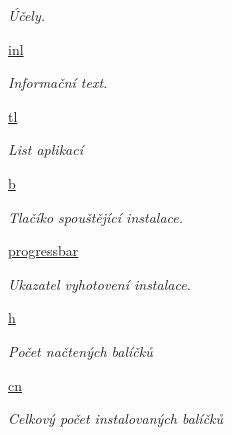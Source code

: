 \begin{DoxyCompactItemize}
\begin{DoxyCompactList}\small\item\em Účely. \end{DoxyCompactList}\item 
\hypertarget{classmnFocus_1_1App_afe256570e794996242e331f33796610a}{\hyperlink{classmnFocus_1_1App_afe256570e794996242e331f33796610a}{inl}}\label{db/d36/classmnFocus_1_1App_afe256570e794996242e331f33796610a}

\begin{DoxyCompactList}\small\item\em Informační text. \end{DoxyCompactList}\item 
\hypertarget{classmnFocus_1_1App_a8f12bcadf8d094ec3c00f5c003ec963c}{\hyperlink{classmnFocus_1_1App_a8f12bcadf8d094ec3c00f5c003ec963c}{tl}}\label{db/d36/classmnFocus_1_1App_a8f12bcadf8d094ec3c00f5c003ec963c}

\begin{DoxyCompactList}\small\item\em List aplikací \end{DoxyCompactList}\item 
\hypertarget{classmnFocus_1_1App_adaafedf80722dbc5b43480b07fbfb5f9}{\hyperlink{classmnFocus_1_1App_adaafedf80722dbc5b43480b07fbfb5f9}{b}}\label{db/d36/classmnFocus_1_1App_adaafedf80722dbc5b43480b07fbfb5f9}

\begin{DoxyCompactList}\small\item\em Tlačíko spouštějící instalace. \end{DoxyCompactList}\item 
\hypertarget{classmnFocus_1_1App_a5bb738352b2df761b6315f8e400ac1f0}{\hyperlink{classmnFocus_1_1App_a5bb738352b2df761b6315f8e400ac1f0}{progressbar}}\label{db/d36/classmnFocus_1_1App_a5bb738352b2df761b6315f8e400ac1f0}

\begin{DoxyCompactList}\small\item\em Ukazatel vyhotovení instalace. \end{DoxyCompactList}\item 
\hypertarget{classmnFocus_1_1App_a894b544a9d4fca1c75b7f16b44d8a33e}{\hyperlink{classmnFocus_1_1App_a894b544a9d4fca1c75b7f16b44d8a33e}{h}}\label{db/d36/classmnFocus_1_1App_a894b544a9d4fca1c75b7f16b44d8a33e}

\begin{DoxyCompactList}\small\item\em Počet načtených balíčků \end{DoxyCompactList}\item 
\hypertarget{classmnFocus_1_1App_a6c2b18044b5b0d3bda8a1326490e93bc}{\hyperlink{classmnFocus_1_1App_a6c2b18044b5b0d3bda8a1326490e93bc}{cn}}\label{db/d36/classmnFocus_1_1App_a6c2b18044b5b0d3bda8a1326490e93bc}

\begin{DoxyCompactList}\small\item\em Celkový počet instalovaných balíčků \end{DoxyCompactList}\end{DoxyCompactItemize}


